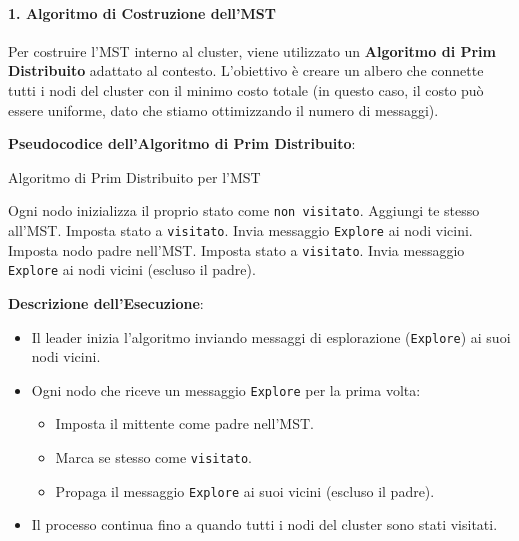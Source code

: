 \documentclass[12pt, a4paper]{report}
\begin{document}
\paragraph{1. Algoritmo di Costruzione dell'MST}

Per costruire l'MST interno al cluster, viene utilizzato un \textbf{Algoritmo di Prim Distribuito} adattato al contesto. L'obiettivo è creare un albero che connette tutti i nodi del cluster con il minimo costo totale (in questo caso, il costo può essere uniforme, dato che stiamo ottimizzando il numero di messaggi).

\textbf{Pseudocodice dell'Algoritmo di Prim Distribuito}:

\begin{algorithm}[H]
\caption{Algoritmo di Prim Distribuito per l'MST}
\begin{algorithmic}[1]
\State Ogni nodo inizializza il proprio stato come \texttt{non visitato}.
    \State Aggiungi te stesso all'MST.
    \State Imposta stato a \texttt{visitato}.
    \State Invia messaggio \texttt{Explore} ai nodi vicini.
\EndIf
{}
        \State Imposta nodo padre nell'MST.
        \State Imposta stato a \texttt{visitato}.
        \State Invia messaggio \texttt{Explore} ai nodi vicini (escluso il padre).
    \EndIf
\EndWhile
\end{algorithmic}
\end{algorithm}

\textbf{Descrizione dell'Esecuzione}:

\begin{itemize}
    \item Il leader inizia l'algoritmo inviando messaggi di esplorazione (\texttt{Explore}) ai suoi nodi vicini.
    \item Ogni nodo che riceve un messaggio \texttt{Explore} per la prima volta:
    \begin{itemize}
        \item Imposta il mittente come padre nell'MST.
        \item Marca se stesso come \texttt{visitato}.
        \item Propaga il messaggio \texttt{Explore} ai suoi vicini (escluso il padre).
    \end{itemize}
    \item Il processo continua fino a quando tutti i nodi del cluster sono stati visitati.
\end{itemize}
\end{document}
